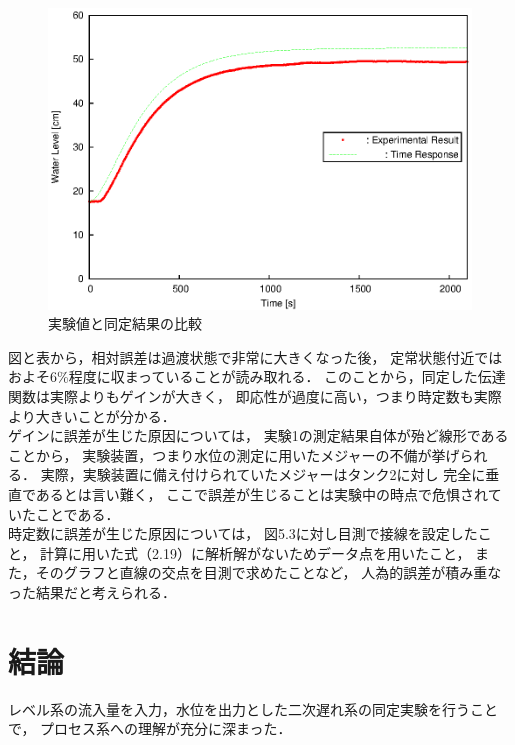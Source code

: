 \documentclass[11pt,a4paper]{jsarticle}
\begin{document}
    \begin{figure}[h]
      \begin{center}
        \includegraphics[width=0.9\hsize]{./fig/data4dpt.eps}
      \end{center}
      \caption{実験値と同定結果の比較}
      \label{fig:data4}
    \end{figure}

    

    図と表から，相対誤差は過渡状態で非常に大きくなった後，
    定常状態付近ではおよそ6\%程度に収まっていることが読み取れる．
    このことから，同定した伝達関数は実際よりもゲインが大きく，
    即応性が過度に高い，つまり時定数も実際より大きいことが分かる．\\

    ゲインに誤差が生じた原因については，
    実験1の測定結果自体が殆ど線形であることから，
    実験装置，つまり水位の測定に用いたメジャーの不備が挙げられる．
    実際，実験装置に備え付けられていたメジャーはタンク2に対し
    完全に垂直であるとは言い難く，
    ここで誤差が生じることは実験中の時点で危惧されていたことである．\\

    時定数に誤差が生じた原因については，
    図5.3に対し目測で接線を設定したこと，
    計算に用いた式（2.19）に解析解がないためデータ点を用いたこと，
    また，そのグラフと直線の交点を目測で求めたことなど，
    人為的誤差が積み重なった結果だと考えられる．\\

\section{結論}
  レベル系の流入量を入力，水位を出力とした二次遅れ系の同定実験を行うことで，
  プロセス系への理解が充分に深まった．
\end{document}
